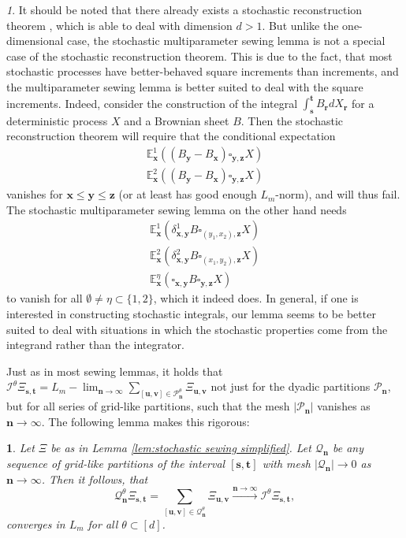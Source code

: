 \documentclass[11pt,oneside,english,reqno]{amsart}
\numberwithin{equation}{section}
\numberwithin{figure}{section}
\theoremstyle{plain}
\theoremstyle{definition}
\theoremstyle{remark}
\newtheorem{rem}[thm]{\protect\remarkname}
\theoremstyle{plain}
\newtheorem{lem}[thm]{\protect\lemmaname}
\theoremstyle{plain}
\theoremstyle{plain}
\theoremstyle{plain}
\theoremstyle{plain}
\providecommand{\lemmaname}{Lemma}
\providecommand{\remarkname}{Remark}
\newcommand{\cI}{\mathcal{I}}
\newcommand{\cP}{\mathcal{P}}
\newcommand{\cQ}{\mathcal{Q}}
\newcommand{\EE}{\mathbb{E}}
\newcommand{\bn}{\mathbf{n}}
\newcommand{\br}{\mathbf{r}}
\newcommand{\bx}{\mathbf{x}}
\newcommand{\by}{\mathbf{y}}
\newcommand{\bu}{\mathbf{u}}
\newcommand{\bv}{\mathbf{v}}
\newcommand{\bs}{\mathbf{s}}
\newcommand{\bt}{\mathbf{t}}
\newcommand{\bz}{\mathbf{z}}
\newcommand{\abs}[1]{\left\lvert #1\right\rvert}
\begin{document}
\begin{rem}
    It should be noted that there already exists a stochastic reconstruction theorem \cite{kern2023stochastic}, which is able to deal with dimension $d>1$. But unlike the one-dimensional case, the stochastic multiparameter sewing lemma is not a special case of the stochastic reconstruction theorem. This is due to the fact, that most stochastic processes have better-behaved square increments than increments, and the multiparameter sewing lemma is better suited to deal with the square increments. Indeed, consider the construction of the integral $\int_{\bs}^\bt B_\br dX_\br$ for a deterministic process $X$ and a Brownian sheet $B$. Then the stochastic reconstruction theorem will require that the conditional expectation
%
    \begin{align*}
        \EE^1_\bx((B_\by - B_\bx)\square_{\by,\bz} X)\\
        \EE^2_\bx((B_\by - B_\bx)\square_{\by,\bz} X)
    \end{align*}
%
    vanishes for $\bx\le\by\le\bz$ (or at least has good enough $L_m$-norm), and will thus fail. The stochastic multiparameter sewing lemma on the other hand needs
%
    \begin{gather*}
        \EE^1_\bx(\delta^1_{\bx,\by} B\square_{(y_1,x_2),\bz} X)\\
        \EE^2_\bx(\delta^2_{\bx,\by} B\square_{(x_1,y_2),\bz} X)\\
        \EE^\eta_\bx(\square_{\bx,\by} B\square_{\by,\bz} X)
    \end{gather*}
%
    to vanish for all $\emptyset\neq\eta\subset\{1,2\}$, which it indeed does. In general, if one is interested in constructing stochastic integrals, our lemma seems to be better suited to deal with situations in which the stochastic properties come from the integrand rather than the integrator.
\end{rem}

\noindent
Just as in most sewing lemmas, it holds that $\cI^\theta\Xi_{\bs,\bt} = L_m-\lim_{\bn\to\infty}\sum_{[\bu,\bv]\in\cP^\theta_\bn}\Xi_{\bu,\bv}$ not just for the dyadic partitions $\cP_\bn$, but for all series of grid-like partitions, such that the mesh $\abs{\cP_\bn}$ vanishes as $\bn\to\infty$. The following lemma makes this rigorous:

\begin{lem}\label{lem:every partition converges}
    Let $\Xi$ be as in Lemma \ref{lem:stochastic sewing simplified}. Let $\cQ_\bn$ be any sequence of grid-like partitions of the interval $[\bs,\bt]$ with mesh $\abs{\cQ_\bn}\to 0$ as $\bn\to\infty$. Then it follows, that
%
    \begin{equation*}
        \cQ^\theta_\bn\Xi_{\bs,\bt} = \sum_{[\bu,\bv]\in\cQ_\bn^\theta}\Xi_{\bu,\bv} \xrightarrow{\bn\to\infty} \cI^\theta\Xi_{\bs,\bt},
    \end{equation*}
%
converges in $L_m$ for all $\theta\subset[d]$.
\end{lem}
\end{document}
